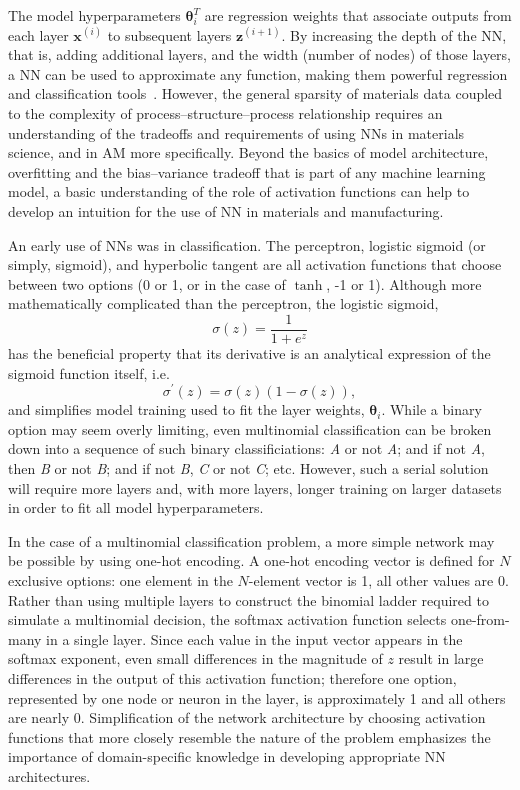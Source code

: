The model hyperparameters $\mathbf{\theta}_i^T$ are regression weights that associate outputs from each layer $\mathbf{x}^{(i)}$ to subsequent layers $\mathbf{z}^{(i + 1)}$. By increasing the depth of the NN, that is, adding additional layers, and the width (number of nodes) of those layers, a NN can be used to approximate any function, making them powerful regression and classification tools~\cite{Hornik1989}. However, the general sparsity of materials data coupled to the complexity of process--structure--process relationship requires an understanding of the tradeoffs and requirements of using NNs in materials science, and in AM more specifically. Beyond the basics of model architecture, overfitting and the bias--variance tradeoff that is part of any machine learning model, a basic understanding of the role of activation functions can help to develop an intuition for the use of NN in materials and manufacturing.

An early use of NNs was in classification. The perceptron, logistic sigmoid (or simply, sigmoid), and hyperbolic tangent are all activation functions that choose between two options (0 or 1, or in the case of $\tanh$, -1 or 1). Although more mathematically complicated than the perceptron, the logistic sigmoid,
\begin{equation}
	\sigma(z) = \frac{1}{1 + e^z}
	\label{sigmaz}
\end{equation}
has the beneficial property that its derivative is an analytical expression of the sigmoid function itself, i.e.
\begin{equation}
	\sigma^\prime(z) = \sigma(z) \left( 1 - \sigma(z) \right),
	\label{sigmaprime}
\end{equation}
and simplifies model training used to fit the layer weights, $\boldsymbol \theta_i$. While a binary option may seem overly limiting, even multinomial classification can be broken down into a sequence of such binary classificiations: \textit{A} or not \textit{A}; and if not \textit{A}, then \textit{B} or not \textit{B}; and if not \textit{B}, \textit{C} or not \textit{C}; etc. However, such a serial solution will require more layers and, with more layers, longer training on larger datasets in order to fit all model hyperparameters.

In the case of a multinomial classification problem, a more simple network may be possible by using one-hot encoding. A one-hot encoding vector is defined for $N$ exclusive options: one element in the $N$-element vector is 1, all other values are 0. Rather than using multiple layers to construct the binomial ladder required to simulate a multinomial decision, the softmax activation function selects one-from-many in a single layer. Since each value in the input vector appears in the softmax exponent, even small differences in the magnitude of $z$ result in large differences in the output of this activation function; therefore one option, represented by one node or neuron in the layer, is approximately 1 and all others are nearly 0. Simplification of the network architecture by choosing activation functions that more closely resemble the nature of the problem emphasizes the importance of domain-specific knowledge in developing appropriate NN architectures.

